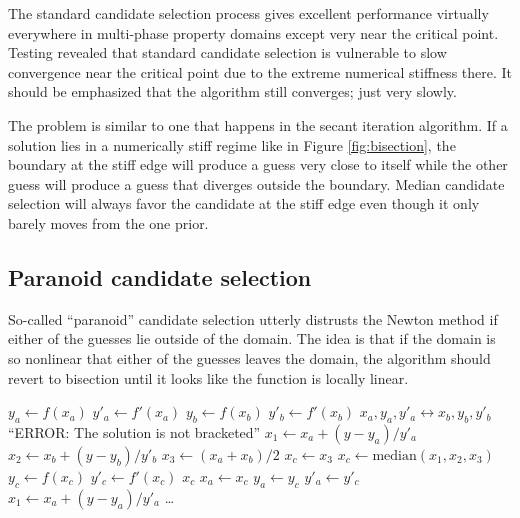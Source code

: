 The standard candidate selection process gives excellent performance virtually everywhere in multi-phase property domains except very near the critical point.  Testing revealed that standard candidate selection is vulnerable to slow convergence near the critical point due to the extreme numerical stiffness there.  It should be emphasized that the algorithm still converges; just very slowly.

The problem is similar to one that happens in the secant iteration algorithm.  If a solution lies in a numerically stiff regime like in Figure \ref{fig:bisection}, the boundary at the stiff edge will produce a guess very close to itself while the other guess will produce a guess that diverges outside the boundary.  Median candidate selection will always favor the candidate at the stiff edge even though it only barely moves from the one prior.

\subsection{Paranoid candidate selection}

So-called ``paranoid'' candidate selection utterly distrusts the Newton method if either of the guesses lie outside of the domain.  The idea is that if the domain is so nonlinear that either of the guesses leaves the domain, the algorithm should revert to bisection until it looks like the function is locally linear.

\begin{algorithm}
\caption{HYBRID1: Paranoid hybrid iteration}\label{alg:hybrid1:paranoid}
\begin{algorithmic}
\State $y_a \gets f(x_a)$   
\State $y'_a \gets f'(x_a)$
\State $y_b \gets f(x_b)$
\State $y'_b \gets f'(x_b)$
    \State $x_a,y_a,y'_a \leftrightarrow x_b,y_b,y'_b$  
\EndIf
{}
    \State \Return ``ERROR: The solution is not bracketed''
\EndIf
\State $x_1 \gets x_a + (y-y_a)/y'_a$   
\State $x_2 \gets x_b + (y-y_b)/y'_b$
\State $x_3 \gets (x_a + x_b)/2$
     
    \State {}
        \State $x_c \gets x_3$ 
    \Else
        \State $x_c \gets \mathrm{median}(x_1,x_2,x_3)$ 
    \EndIf
    \State $y_c \gets f(x_c)$ 
    \State $y'_c\gets f'(x_c)$ 
     
        \State \Return $x_c$
    \EndIf
     
        \State $x_a \gets x_c$ 
        \State $y_a \gets y_c$
        \State $y'_a \gets y'_c$
        \State $x_1 \gets x_a + (y - y_a)/y'_a$ 
        \State \ldots
{}
\end{algorithmic}
\end{algorithm}

